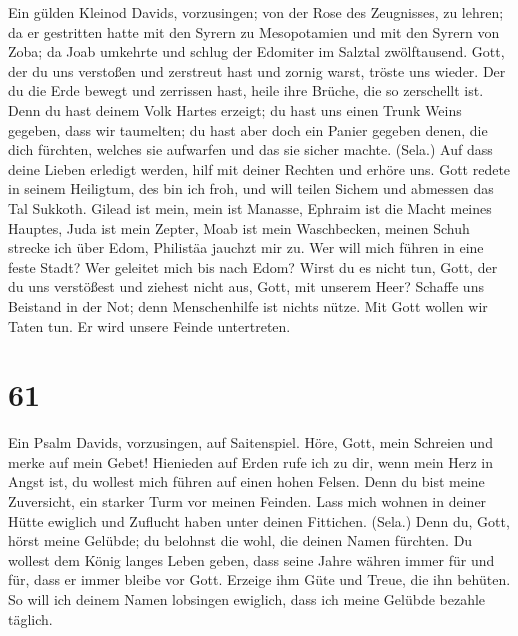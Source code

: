  Ein gülden Kleinod Davids, vorzusingen; von der Rose des
Zeugnisses, zu lehren;  da er gestritten hatte mit den
Syrern zu Mesopotamien und mit den Syrern von Zoba; da Joab umkehrte und
schlug der Edomiter im Salztal zwölftausend.  Gott, der du
uns verstoßen und zerstreut hast und zornig warst, tröste uns wieder.
 Der du die Erde bewegt und zerrissen hast, heile ihre
Brüche, die so zerschellt ist.  Denn du hast deinem Volk
Hartes erzeigt; du hast uns einen Trunk Weins gegeben, dass wir
taumelten;  du hast aber doch ein Panier gegeben denen,
die dich fürchten, welches sie aufwarfen und das sie sicher machte.
(Sela.)  Auf dass deine Lieben erledigt werden, hilf mit
deiner Rechten und erhöre uns.  Gott redete in seinem
Heiligtum, des bin ich froh, und will teilen Sichem und abmessen das Tal
Sukkoth.  Gilead ist mein, mein ist Manasse, Ephraim ist
die Macht meines Hauptes, Juda ist mein Zepter,  Moab ist
mein Waschbecken, meinen Schuh strecke ich über Edom, Philistäa jauchzt
mir zu.  Wer will mich führen in eine feste Stadt? Wer
geleitet mich bis nach Edom?  Wirst du es nicht tun,
Gott, der du uns verstößest und ziehest nicht aus, Gott, mit unserem
Heer?  Schaffe uns Beistand in der Not; denn
Menschenhilfe ist nichts nütze.  Mit Gott wollen wir
Taten tun. Er wird unsere Feinde untertreten.

\hypertarget{section-60}{%
\section{61}\label{section-60}}

 Ein Psalm Davids, vorzusingen, auf Saitenspiel.
 Höre, Gott, mein Schreien und merke auf mein Gebet!
 Hienieden auf Erden rufe ich zu dir, wenn mein Herz in
Angst ist, du wollest mich führen auf einen hohen Felsen. 
Denn du bist meine Zuversicht, ein starker Turm vor meinen Feinden.
 Lass mich wohnen in deiner Hütte ewiglich und Zuflucht
haben unter deinen Fittichen. (Sela.)  Denn du, Gott,
hörst meine Gelübde; du belohnst die wohl, die deinen Namen fürchten.
 Du wollest dem König langes Leben geben, dass seine Jahre
währen immer für und für,  dass er immer bleibe vor Gott.
Erzeige ihm Güte und Treue, die ihn behüten.  So will ich
deinem Namen lobsingen ewiglich, dass ich meine Gelübde bezahle täglich.

